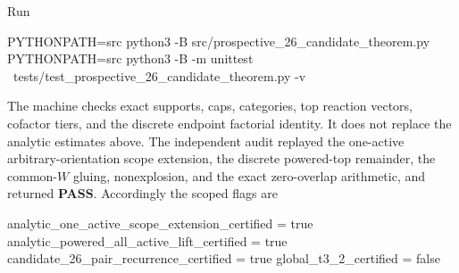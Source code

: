 Run

\begin{CodeBlock}
PYTHONPATH=src python3 -B src/prospective_26_candidate_theorem.py
PYTHONPATH=src python3 -B -m unittest \
  tests/test_prospective_26_candidate_theorem.py -v
\end{CodeBlock}

The machine checks exact supports, caps, categories, top reaction
vectors, cofactor tiers, and the discrete endpoint factorial identity.
It does not replace the analytic estimates above. The independent audit
replayed the one-active arbitrary-orientation scope extension, the
discrete powered-top remainder, the common-\(W\) gluing, nonexplosion,
and the exact zero-overlap arithmetic, and returned \textbf{PASS}.
Accordingly the scoped flags are

\begin{CodeBlock}
analytic_one_active_scope_extension_certified = true
analytic_powered_all_active_lift_certified = true
candidate_26_pair_recurrence_certified = true
global_t3_2_certified = false
\end{CodeBlock}
